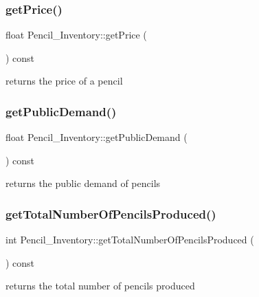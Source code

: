 \subsubsection{\texorpdfstring{get\+Price()}{getPrice()}}
{\footnotesize\ttfamily float Pencil\+\_\+\+Inventory\+::get\+Price (\begin{DoxyParamCaption}{ }\end{DoxyParamCaption}) const}



returns the price of a pencil 

\mbox{\label{classPencil__Inventory_ac9bab24db01e4515abe06a3c5ec48fcf}} 
\subsubsection{\texorpdfstring{get\+Public\+Demand()}{getPublicDemand()}}
{\footnotesize\ttfamily float Pencil\+\_\+\+Inventory\+::get\+Public\+Demand (\begin{DoxyParamCaption}{ }\end{DoxyParamCaption}) const}



returns the public demand of pencils 

\mbox{\label{classPencil__Inventory_ad7efa852dea32675f689e36c0ddfd7a7}} 
\subsubsection{\texorpdfstring{get\+Total\+Number\+Of\+Pencils\+Produced()}{getTotalNumberOfPencilsProduced()}}
{\footnotesize\ttfamily int Pencil\+\_\+\+Inventory\+::get\+Total\+Number\+Of\+Pencils\+Produced (\begin{DoxyParamCaption}{ }\end{DoxyParamCaption}) const}



returns the total number of pencils produced 

